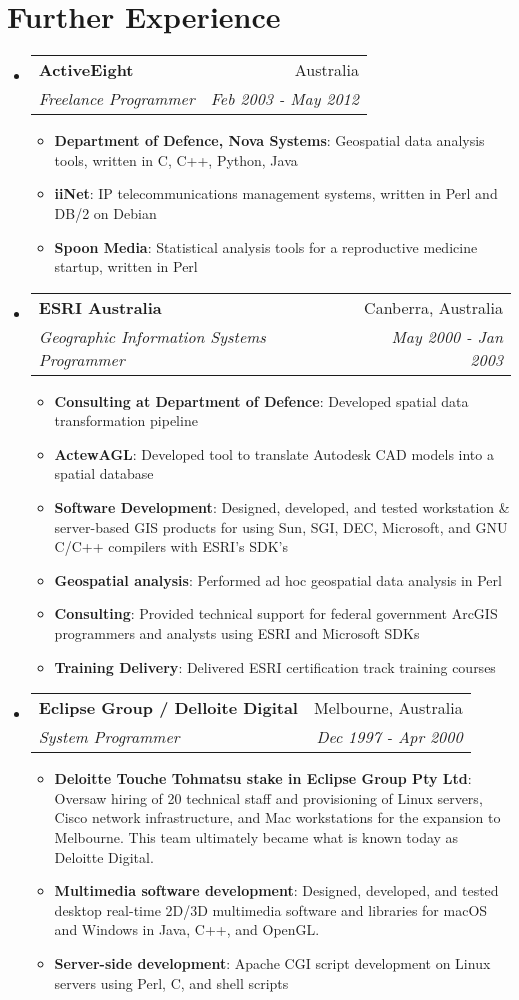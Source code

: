 \documentclass[11pt]{article}
\makeatletter
\newcommand{\resumeItem}[2]{
  \item\small{
    \textbf{#1}{: #2 \vspace{-2pt}}
  }
}
\newcommand{\resumeSubheading}[4]{
  \vspace{-1pt}\item
    \begin{tabular*}{0.97\textwidth}[t]{l@{\extracolsep{\fill}}r}
      \textbf{#1} & #2 \\
      \textit{\small#3} & \textit{\small #4} \\
    \end{tabular*}\vspace{-5pt}
}
\newcommand{\resumeSubHeadingListStart}{\begin{itemize}[leftmargin=*]}
\newcommand{\resumeSubHeadingListEnd}{\end{itemize}}
\newcommand{\resumeItemListStart}{\begin{itemize}}
\newcommand{\resumeItemListEnd}{\end{itemize}\vspace{-5pt}}
\makeatother
\begin{document}
\section{Further Experience}
  \resumeSubHeadingListStart
    \resumeSubheading
        {ActiveEight}{Australia}
        {Freelance Programmer}{Feb 2003 - May 2012}
        \resumeItemListStart
          \resumeItem{Department of Defence, Nova Systems}
            {Geospatial data analysis tools, written in C, C++, Python, Java}
          \resumeItem{iiNet}
            {IP telecommunications management systems, written in Perl and DB/2 on Debian}
          \resumeItem{Spoon Media}
            {Statistical analysis tools for a reproductive medicine startup, written in Perl}
        \resumeItemListEnd

    \resumeSubheading
      {ESRI Australia}{Canberra, Australia}
      {Geographic Information Systems Programmer}{May 2000 - Jan 2003}
        \resumeItemListStart
          \resumeItem{Consulting at Department of Defence}
            {Developed spatial data transformation pipeline}
          \resumeItem{ActewAGL}
            {Developed tool to translate Autodesk CAD models into a spatial database}
          \resumeItem{Software Development}
            {Designed, developed, and tested workstation \& server-based GIS products for using Sun, SGI, DEC, Microsoft, and GNU C/C++ compilers with ESRI's SDK's}
          \resumeItem{Geospatial analysis}
            {Performed ad hoc geospatial data analysis in Perl}
          \resumeItem{Consulting}
            {Provided technical support for federal government ArcGIS programmers and analysts using ESRI and Microsoft SDKs}
          \resumeItem{Training Delivery}
            {Delivered ESRI certification track training courses}
        \resumeItemListEnd

    \resumeSubheading
      {Eclipse Group / Delloite Digital}{Melbourne, Australia}
      {System Programmer}{Dec 1997 - Apr 2000}
        \resumeItemListStart
        \resumeItem{Deloitte Touche Tohmatsu stake in Eclipse Group Pty Ltd}
          {Oversaw hiring of 20 technical staff and provisioning of Linux servers, Cisco network infrastructure, and Mac workstations for the expansion to Melbourne. This team ultimately became what is known today as Deloitte Digital.}
        \resumeItem{Multimedia software development}
          {Designed, developed, and tested desktop real-time 2D/3D multimedia software and libraries for macOS and Windows in Java, C++, and OpenGL.}
        \resumeItem{Server-side development}
          {Apache CGI script development on Linux servers using Perl, C, and shell scripts}
        \resumeItemListEnd
    \resumeSubHeadingListEnd
\end{document}
